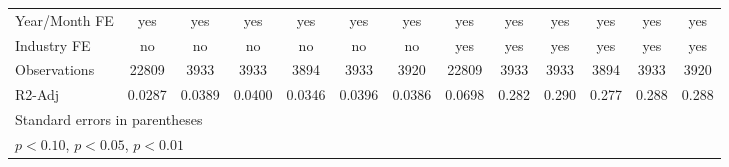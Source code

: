 {\begin{tabular}{l*{12}{c}}
\hline
Year/Month FE       &         yes         &         yes         &         yes         &         yes         &         yes         &         yes         &         yes         &         yes         &         yes         &         yes         &         yes         &         yes         \\
Industry FE         &          no         &          no         &          no         &          no         &          no         &          no         &         yes         &         yes         &         yes         &         yes         &         yes         &         yes         \\
Observations        &       22809         &        3933         &        3933         &        3894         &        3933         &        3920         &       22809         &        3933         &        3933         &        3894         &        3933         &        3920         \\
R2-Adj              &      0.0287         &      0.0389         &      0.0400         &      0.0346         &      0.0396         &      0.0386         &      0.0698         &       0.282         &       0.290         &       0.277         &       0.288         &       0.288         \\
\hline\hline
\multicolumn{13}{l}{\footnotesize Standard errors in parentheses}\\
\multicolumn{13}{l}{\footnotesize \sym{*} \(p<0.10\), \sym{**} \(p<0.05\), \sym{***} \(p<0.01\)}\\
\end{tabular}
}
